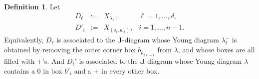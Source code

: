 \documentclass{amsart}
\def\Le{\hbox{\rotatebox[origin=c]{180}{$\Gamma$}}}
\theoremstyle{definition}
\newtheorem{definition}[thm]{Definition}
\numberwithin{equation}{section}
\begin{document}
\begin{definition}\label{def:positroiddivisors}
Let 
	\[\begin{array}{ccll}\label{e:Dis}
D_\ell&:=&X_{\lambda^-_\ell},& \ell=1,\dotsc, d,\\
D'_i&:=& X_{(s_i,w_\lambda)}, & i=1,\dotsc, n-1.
\end{array}
	\]
Equivalently,
$D_{\ell}$ is 
associated to the $\Le$-diagram whose
 Young diagram $\lambda_\ell^-$ is 
	obtained by removing the outer corner box $b_{\rho_{2\ell-1}}$ 
	from $\lambda$, and whose boxes are all filled with $+$'s.
And $D_i'$ is associated to the $\Le$-diagram whose 
Young diagram $\lambda$ contains a $0$ in  box $b'_i$ 
	and a $+$ in every other box. 
\end{definition}
\end{document}
